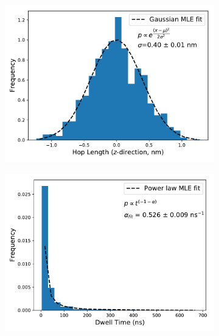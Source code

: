 \documentclass{article}
\begin{document}
  \begin{figure}[h!]
  \centering
  \begin{subfigure}{0.325\textwidth}
  \includegraphics[width=\linewidth]{hop_distribution_GCL.pdf}
  \caption{}\label{fig:hop_dist}
  \end{subfigure}
  \begin{subfigure}{0.325\textwidth}
  \includegraphics[width=\linewidth]{dwell_distribution_GCL.pdf}
  \caption{}\label{fig:dwell_dist}
  \end{subfigure}
  \begin{subfigure}{0.325\textwidth}

\end{subfigure}
\end{figure}
\end{document}

